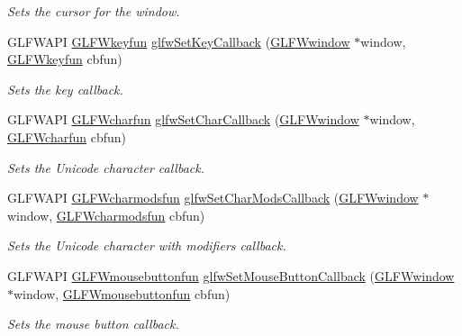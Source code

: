 \begin{CompactItemize}
\begin{CompactList}\small\item\em Sets the cursor for the window. \item\end{CompactList}\item 
GLFWAPI \hyperlink{group__input_g592dd1919f8a1dc7576b13cdd8b7b695}{GLFWkeyfun} \hyperlink{group__input_ga73bb92f628a2a0be9c132d56f19362c}{glfwSetKeyCallback} (\hyperlink{group__window_g3c96d80d363e67d13a41b5d1821f3242}{GLFWwindow} $\ast$window, \hyperlink{group__input_g592dd1919f8a1dc7576b13cdd8b7b695}{GLFWkeyfun} cbfun)
\begin{CompactList}\small\item\em Sets the key callback. \item\end{CompactList}\item 
GLFWAPI \hyperlink{group__input_g1103f1876518acecb5976f6b307c51d1}{GLFWcharfun} \hyperlink{group__input_g07b2959b23dc3e466ce7475746021002}{glfwSetCharCallback} (\hyperlink{group__window_g3c96d80d363e67d13a41b5d1821f3242}{GLFWwindow} $\ast$window, \hyperlink{group__input_g1103f1876518acecb5976f6b307c51d1}{GLFWcharfun} cbfun)
\begin{CompactList}\small\item\em Sets the Unicode character callback. \item\end{CompactList}\item 
GLFWAPI \hyperlink{group__input_g3826e9cf33f760c1480d6ce873f9d002}{GLFWcharmodsfun} \hyperlink{group__input_ge6eee0bda7429bfe8028615847cf6795}{glfwSetCharModsCallback} (\hyperlink{group__window_g3c96d80d363e67d13a41b5d1821f3242}{GLFWwindow} $\ast$window, \hyperlink{group__input_g3826e9cf33f760c1480d6ce873f9d002}{GLFWcharmodsfun} cbfun)
\begin{CompactList}\small\item\em Sets the Unicode character with modifiers callback. \item\end{CompactList}\item 
GLFWAPI \hyperlink{group__input_g1e008c7a8751cea648c8f42cc91104cf}{GLFWmousebuttonfun} \hyperlink{group__input_g20e5ba1ce4e086aedd48a06dc311c95f}{glfwSetMouseButtonCallback} (\hyperlink{group__window_g3c96d80d363e67d13a41b5d1821f3242}{GLFWwindow} $\ast$window, \hyperlink{group__input_g1e008c7a8751cea648c8f42cc91104cf}{GLFWmousebuttonfun} cbfun)
\begin{CompactList}\small\item\em Sets the mouse button callback. \item\end{CompactList}\item 

\end{CompactItemize}
